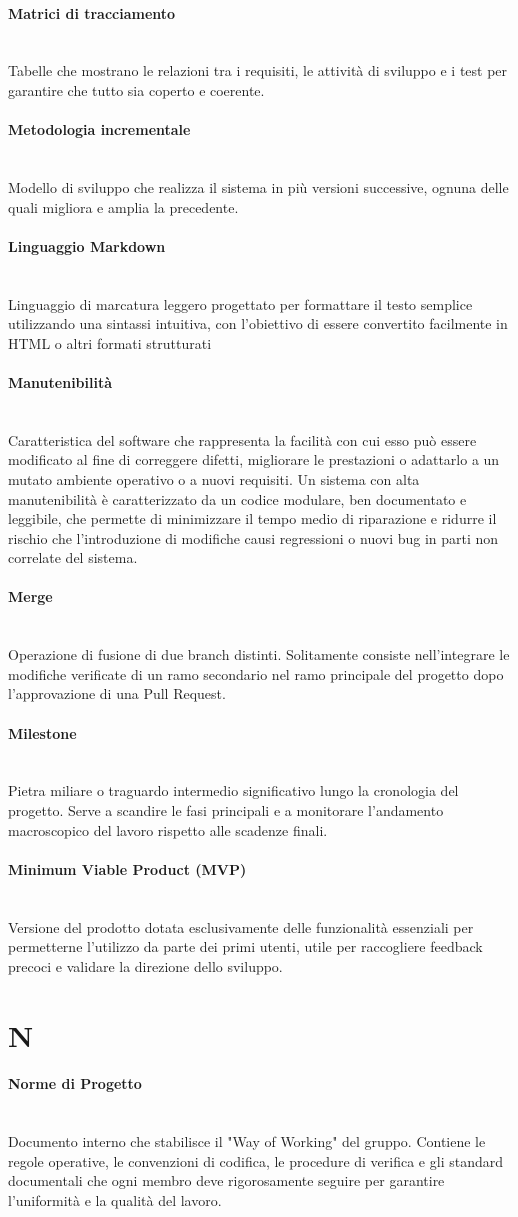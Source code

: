 \documentclass[a4paper, 10pt, colorlinks=true, linkcolor=black, urlcolor=blue, citecolor=blue, hidelinks]{article}
\newcommand{\glossaryterm}[2]{
    \paragraph{#1 \label{term:#1}} \mbox{} \\
    #2
    \vspace{0.5em}
}
\begin{document}
\glossaryterm{Matrici di tracciamento}{Tabelle che mostrano le relazioni tra i requisiti, le attività di sviluppo e i test per garantire che tutto sia coperto e coerente.}

\glossaryterm{Metodologia incrementale}{Modello di sviluppo che realizza il sistema in più versioni successive, ognuna delle quali migliora e amplia la precedente.}

\glossaryterm{Linguaggio Markdown}{Linguaggio di marcatura leggero progettato per formattare il testo semplice utilizzando una sintassi intuitiva, con l’obiettivo di essere convertito facilmente in HTML o altri formati strutturati}

\glossaryterm{Manutenibilità}{Caratteristica del software che rappresenta la facilità con cui esso può essere modificato al fine di correggere difetti, migliorare le prestazioni o adattarlo a un mutato ambiente operativo o a nuovi requisiti. Un sistema con alta manutenibilità è caratterizzato da un codice modulare, ben documentato e leggibile, che permette di minimizzare il tempo medio di riparazione e ridurre il rischio che l'introduzione di modifiche causi regressioni o nuovi bug in parti non correlate del sistema.}

\glossaryterm{Merge}{Operazione di fusione di due branch distinti. Solitamente consiste nell'integrare le modifiche verificate di un ramo secondario nel ramo principale del progetto dopo l'approvazione di una Pull Request.}

\glossaryterm{Milestone}{Pietra miliare o traguardo intermedio significativo lungo la cronologia del progetto. Serve a scandire le fasi principali e a monitorare l'andamento macroscopico del lavoro rispetto alle scadenze finali.}

\glossaryterm{Minimum Viable Product (MVP)}{Versione del prodotto dotata esclusivamente delle funzionalità essenziali per permetterne l'utilizzo da parte dei primi utenti, utile per raccogliere feedback precoci e validare la direzione dello sviluppo.}

\newpage

\section*{N}

\glossaryterm{Norme di Progetto}{Documento interno che stabilisce il "Way of Working" del gruppo. Contiene le regole operative, le convenzioni di codifica, le procedure di verifica e gli standard documentali che ogni membro deve rigorosamente seguire per garantire l'uniformità e la qualità del lavoro.}
\end{document}
